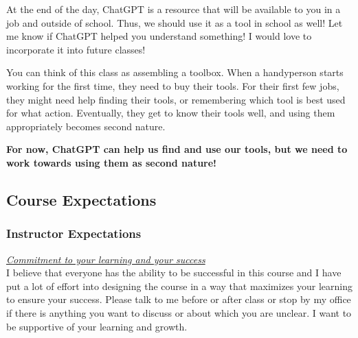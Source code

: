 \documentclass[
  letterpaper,
  DIV=11,
  numbers=noendperiod]{scrartcl}
\begin{document}
At the end of the day, ChatGPT is a resource that will be available to
you in a job and outside of school. Thus, we should use it as a tool in
school as well! Let me know if ChatGPT helped you understand something!
I would love to incorporate it into future classes!

\begin{tcolorbox}[enhanced jigsaw, rightrule=.15mm, left=2mm, colframe=quarto-callout-important-color-frame, leftrule=.75mm, toprule=.15mm, opacityback=0, colback=white, arc=.35mm, titlerule=0mm, title=\textcolor{quarto-callout-important-color}{\faExclamation}\hspace{0.5em}{Important}, toptitle=1mm, colbacktitle=quarto-callout-important-color!10!white, coltitle=black, breakable, bottomtitle=1mm, bottomrule=.15mm, opacitybacktitle=0.6]

You can think of this class as assembling a toolbox. When a handyperson
starts working for the first time, they need to buy their tools. For
their first few jobs, they might need help finding their tools, or
remembering which tool is best used for what action. Eventually, they
get to know their tools well, and using them appropriately becomes
second nature.

\textbf{For now, ChatGPT can help us find and use our tools, but we need
to work towards using them as second nature!}

\end{tcolorbox}

\hypertarget{course-expectations}{%
\subsection{Course Expectations}\label{course-expectations}}

\hypertarget{instructor-expectations}{%
\subsubsection{Instructor Expectations}\label{instructor-expectations}}

\ul{\emph{Commitment to your learning and your success\\
}}I believe that everyone has the ability to be successful in this
course and I have put a lot of effort into designing the course in a way
that maximizes your learning to ensure your success. Please talk to me
before or after class or stop by my office if there is anything you want
to discuss or about which you are unclear. I want to be supportive of
your learning and growth.
\end{document}
